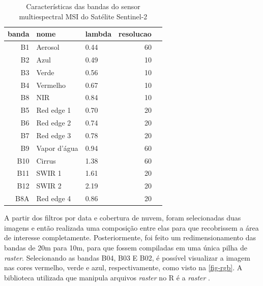 \begin{table}[ht]
\centering
\caption{Características das bandas do sensor multiespectral MSI do Satélite Sentinel-2}
\begin{tabular}{rllrr}
  \hline
 banda & nome & lambda & resolucao \\ 
  \hline
 B1 & Aerosol & 0.44 &  60 \\ 
 B2 & Azul & 0.49 &  10 \\ 
 B3 & Verde & 0.56 &  10 \\ 
 B4 & Vermelho & 0.67 &  10 \\ 
 B8 & NIR & 0.84 &  10 \\ 
 B5 & Red edge 1 & 0.70 &  20 \\ 
 B6 & Red edge 2 & 0.74 &  20 \\ 
 B7 & Red edge 3 & 0.78 &  20 \\ 
 B9 & Vapor d’água & 0.94 &  60 \\ 
 B10 & Cirrus & 1.38 &  60 \\ 
 B11 & SWIR 1 & 1.61 &  20 \\ 
 B12 & SWIR 2 & 2.19 &  20 \\ 
 B8A & Red edge 4 & 0.86 &  20 \\ 
   \hline
\end{tabular}
\label{t.sentinel-msi}
\end{table}

A partir dos filtros por data e cobertura de nuvem, foram selecionadas duas imagens e então realizada uma composição entre elas para que recobrissem a área de interesse completamente. Posteriormente, foi feito um redimensionamento das bandas de 20m para 10m, para que fossem compiladas em uma única pilha de \textit{raster}. Selecionando as bandas B04, B03 E B02, é possível visualizar a imagem nas cores vermelho, verde e azul, respectivamente, como visto na \autoref{fig-rgb}. A biblioteca utilizada que manipula arquivos \textit{raster} no R é a \textit{raster} \cite{raster}.


